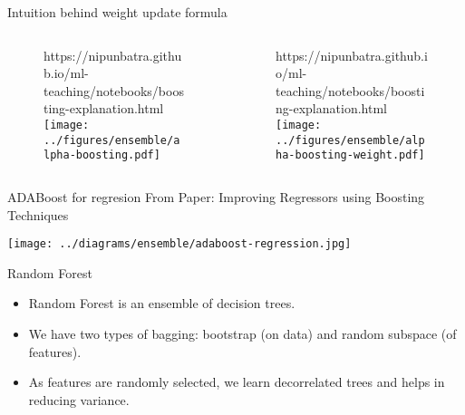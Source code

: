 \documentclass{beamer}
\begin{document}
\begin{frame}{Intuition behind weight update formula}
  \begin{columns}
    \pause \begin{column}{0.5\textwidth}

      \begin{figure}[htp]
        \centering
        \begin{notebookbox}{https://nipunbatra.github.io/ml-teaching/notebooks/boosting-explanation.html}
          \texttt{[image: ../figures/ensemble/alpha-boosting.pdf]}
        \end{notebookbox}
      \end{figure}
    \end{column}
    \pause \begin{column}{0.5\textwidth}
      \begin{figure}[htp]
        \centering
        \begin{notebookbox}{https://nipunbatra.github.io/ml-teaching/notebooks/boosting-explanation.html}
          \texttt{[image: ../figures/ensemble/alpha-boosting-weight.pdf]}
        \end{notebookbox}
      \end{figure}
    \end{column}
  \end{columns}


\end{frame}

\begin{frame}{ADABoost for regresion}
  From Paper: Improving Regressors using Boosting Techniques

  \texttt{[image: ../diagrams/ensemble/adaboost-regression.jpg]}
  
\end{frame}

\begin{frame}{Random Forest}
  \begin{itemize}
    \item Random Forest is an ensemble of decision trees.
    \item We have two types of bagging: bootstrap (on data) and random subspace (of features).
    \item As features are randomly selected, we learn decorrelated trees and helps in reducing variance.
  \end{itemize}
\end{frame}
\end{document}
